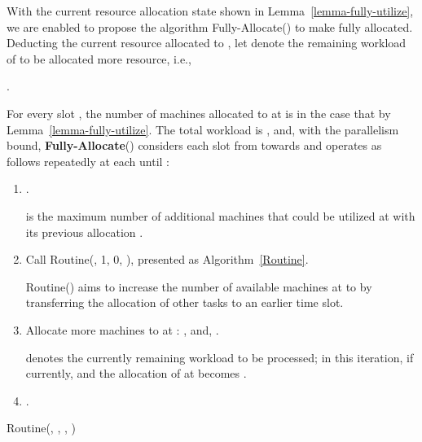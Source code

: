 \documentclass[10pt,journal,compsoc]{IEEEtran}
\begin{document}
With the current resource allocation state shown in Lemma~\ref{lemma-fully-utilize}, we are enabled to propose the algorithm Fully-Allocate() to make  fully allocated. Deducting the current resource allocated to , let  denote the remaining workload of  to be allocated more resource, i.e.,
\begin{center}
.
\end{center}
For every slot , the number  of machines allocated to  at  is  in the case that  by Lemma~\ref{lemma-fully-utilize}. The total workload  is , and, with the parallelism bound, \textbf{Fully-Allocate}() considers each slot  from  towards  and operates as follows repeatedly at each  until :
\begin{enumerate}
 \setlength\itemsep{0.3em}

  \item   .

          \setlength{\parindent}{1em}\vspace{0.15em}{\em Notes.}  is the maximum number of additional machines that could be utilized at  with its previous allocation . 

  \item Call Routine(, 1, 0, ), presented as Algorithm~\ref{Routine}.

        \setlength{\parindent}{1em}\vspace{0.15em}{\em Notes.} Routine() aims to increase the number of available machines  at  to  by transferring the allocation of other tasks to an earlier time slot.

  \item Allocate  more machines to  at : , and, .

      \setlength{\parindent}{1em}\vspace{0.15em}{\em Notes.}  denotes the currently remaining workload to be processed; in this iteration, if  currently,  and the allocation  of  at  becomes .

  \item .
\end{enumerate}


\begin{algorithm}[!ht]





\caption{Routine(, , , )\label{Routine}}
\end{algorithm}
\end{document}
